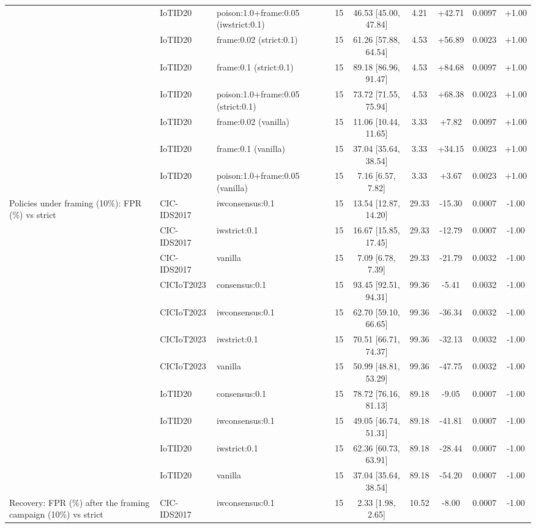 \begin{table}[t]
\begin{tabular}{lllcccccc}
 & IoTID20 & poison:1.0+frame:0.05 (iwstrict:0.1) & 15 & 46.53 [45.00, 47.84] & 4.21 & +42.71 & 0.0097 & +1.00 \\
 & IoTID20 & frame:0.02 (strict:0.1) & 15 & 61.26 [57.88, 64.54] & 4.53 & +56.89 & 0.0023 & +1.00 \\
 & IoTID20 & frame:0.1 (strict:0.1) & 15 & 89.18 [86.96, 91.47] & 4.53 & +84.68 & 0.0097 & +1.00 \\
 & IoTID20 & poison:1.0+frame:0.05 (strict:0.1) & 15 & 73.72 [71.55, 75.94] & 4.53 & +68.38 & 0.0023 & +1.00 \\
 & IoTID20 & frame:0.02 (vanilla) & 15 & 11.06 [10.44, 11.65] & 3.33 & +7.82 & 0.0097 & +1.00 \\
 & IoTID20 & frame:0.1 (vanilla) & 15 & 37.04 [35.64, 38.54] & 3.33 & +34.15 & 0.0023 & +1.00 \\
 & IoTID20 & poison:1.0+frame:0.05 (vanilla) & 15 & 7.16 [6.57, 7.82] & 3.33 & +3.67 & 0.0023 & +1.00 \\
Policies under framing (10\%): FPR (\%) vs strict & CIC-IDS2017 & iwconsensus:0.1 & 15 & 13.54 [12.87, 14.20] & 29.33 & -15.30 & 0.0007 & -1.00 \\
 & CIC-IDS2017 & iwstrict:0.1 & 15 & 16.67 [15.85, 17.45] & 29.33 & -12.79 & 0.0007 & -1.00 \\
 & CIC-IDS2017 & vanilla & 15 & 7.09 [6.78, 7.39] & 29.33 & -21.79 & 0.0032 & -1.00 \\
 & CICIoT2023 & consensus:0.1 & 15 & 93.45 [92.51, 94.31] & 99.36 & -5.41 & 0.0032 & -1.00 \\
 & CICIoT2023 & iwconsensus:0.1 & 15 & 62.70 [59.10, 66.65] & 99.36 & -36.34 & 0.0032 & -1.00 \\
 & CICIoT2023 & iwstrict:0.1 & 15 & 70.51 [66.71, 74.37] & 99.36 & -32.13 & 0.0032 & -1.00 \\
 & CICIoT2023 & vanilla & 15 & 50.99 [48.81, 53.29] & 99.36 & -47.75 & 0.0032 & -1.00 \\
 & IoTID20 & consensus:0.1 & 15 & 78.72 [76.16, 81.13] & 89.18 & -9.05 & 0.0007 & -1.00 \\
 & IoTID20 & iwconsensus:0.1 & 15 & 49.05 [46.74, 51.31] & 89.18 & -41.81 & 0.0007 & -1.00 \\
 & IoTID20 & iwstrict:0.1 & 15 & 62.36 [60.73, 63.91] & 89.18 & -28.44 & 0.0007 & -1.00 \\
 & IoTID20 & vanilla & 15 & 37.04 [35.64, 38.54] & 89.18 & -54.20 & 0.0007 & -1.00 \\
Recovery: FPR (\%) after the framing campaign (10\%) vs strict & CIC-IDS2017 & iwconsensus:0.1 & 15 & 2.33 [1.98, 2.65] & 10.52 & -8.00 & 0.0007 & -1.00 \\

\end{tabular}
\end{table}

